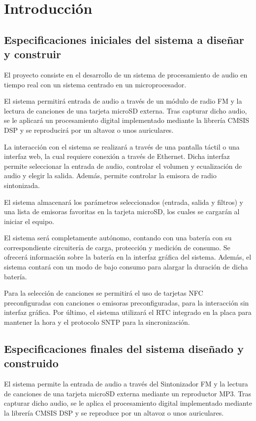 \section{Introducción}

\subsection{Especificaciones iniciales del sistema a diseñar y construir}

El proyecto consiste en el desarrollo de un sistema de procesamiento de audio en tiempo real con un sistema centrado en un microprocesador.

El sistema permitirá entrada de audio a través de un módulo de radio FM y la lectura de canciones de una tarjeta microSD externa. Tras capturar dicho audio, se le aplicará un procesamiento digital implementado mediante la librería CMSIS DSP y se reproducirá por un altavoz o unos auriculares.

La interacción con el sistema se realizará a través de una pantalla táctil o una interfaz web, la cual requiere conexión a través de Ethernet. Dicha interfaz permite seleccionar la entrada de audio, controlar el volumen y ecualización de audio y elegir la salida. Además, permite controlar la emisora de radio sintonizada.

El sistema almacenará los parámetros seleccionados (entrada, salida y filtros) y una lista de emisoras favoritas en la tarjeta microSD, los cuales se cargarán al iniciar el equipo.

El sistema será completamente autónomo, contando con una batería con su correspondiente circuitería de carga, protección y medición de consumo. Se ofrecerá información sobre la batería en la interfaz gráfica del sistema. Además, el sistema contará con un modo de bajo consumo para alargar la duración de dicha batería.

Para la selección de canciones se permitirá el uso de tarjetas NFC preconfiguradas con canciones o emisoras preconfiguradas, para la interacción sin interfaz gráfica. Por último, el sistema utilizará el RTC integrado en la placa para mantener la hora y el protocolo SNTP para la sincronización.

\subsection{Especificaciones finales del sistema diseñado y construido}

El sistema permite la entrada de audio a través del Sintonizador FM y la lectura de canciones de una tarjeta microSD externa  mediante un reproductor MP3. Tras capturar dicho audio, se le aplica el procesamiento digital implementado mediante la librería CMSIS DSP y se reproduce por un altavoz o unos auriculares.

